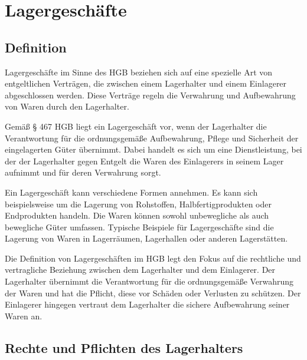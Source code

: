 

\chapter[Lagergeschäfte]{Lagergeschäfte}

\section{Definition}
Lagergeschäfte im Sinne des HGB beziehen sich auf eine spezielle Art von entgeltlichen Verträgen, die zwischen einem Lagerhalter und einem Einlagerer abgeschlossen werden. Diese Verträge regeln die Verwahrung und Aufbewahrung von Waren durch den Lagerhalter.

Gemäß § 467 HGB liegt ein Lagergeschäft vor, wenn der Lagerhalter die Verantwortung für die ordnungsgemäße Aufbewahrung, Pflege und Sicherheit der eingelagerten Güter übernimmt. Dabei handelt es sich um eine Dienstleistung, bei der der Lagerhalter gegen Entgelt die Waren des Einlagerers in seinem Lager aufnimmt und für deren Verwahrung sorgt.

Ein Lagergeschäft kann verschiedene Formen annehmen. Es kann sich beispielsweise um die Lagerung von Rohstoffen, Halbfertigprodukten oder Endprodukten handeln. Die Waren können sowohl unbewegliche als auch bewegliche Güter umfassen. Typische Beispiele für Lagergeschäfte sind die Lagerung von Waren in Lagerräumen, Lagerhallen oder anderen Lagerstätten.

Die Definition von Lagergeschäften im HGB legt den Fokus auf die rechtliche und vertragliche Beziehung zwischen dem Lagerhalter und dem Einlagerer. Der Lagerhalter übernimmt die Verantwortung für die ordnungsgemäße Verwahrung der Waren und hat die Pflicht, diese vor Schäden oder Verlusten zu schützen. Der Einlagerer hingegen vertraut dem Lagerhalter die sichere Aufbewahrung seiner Waren an.
\section{Rechte und Pflichten des Lagerhalters}

